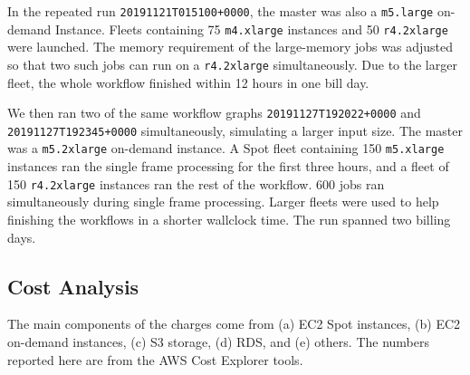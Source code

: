 In the repeated run \texttt{20191121T015100+0000}, the master was also a \texttt{m5.large} on-demand Instance.
Fleets containing 75 \texttt{m4.xlarge} instances and 50 \texttt{r4.2xlarge} were launched.
The memory requirement of the large-memory jobs was adjusted so that two such jobs can run on a \texttt{r4.2xlarge} simultaneously.
Due to the larger fleet, the whole workflow finished within 12 hours in one bill day.

We then ran two of the same workflow graphs \texttt{20191127T192022+0000} and \texttt{20191127T192345+0000} simultaneously, simulating a larger input size.
The master was a \texttt{m5.2xlarge} on-demand instance.
A Spot fleet containing 150 \texttt{m5.xlarge} instances ran the single frame processing for the first three hours, and a fleet of 150 \texttt{r4.2xlarge} instances ran the rest of the workflow.
600 jobs ran simultaneously during single frame processing.
Larger fleets were used to help finishing the workflows in a shorter wallclock time.
The run spanned two billing days.


\subsection{Cost Analysis}

The main components of the charges come from (a) EC2 Spot instances, (b) EC2 on-demand instances, (c) S3 storage, (d) RDS, and (e) others.
The numbers reported here are from the AWS Cost Explorer tools.

